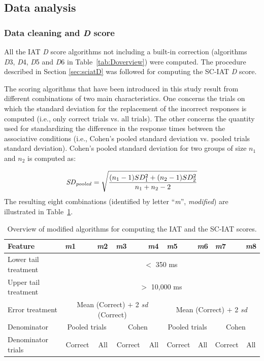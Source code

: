 \documentclass[12pt]{book}
\begin{document}
\subsection{Data analysis}
\subsubsection{Data cleaning and \emph{D} score}

All the IAT \emph{D} score algorithms not including a built-in correction (algorithms \emph{D}3, \emph{D}4, \emph{D}5 and \emph{D}6 in Table~\ref{tab:Doverview}) were computed. The procedure described in Section \ref{sec:sciatD} was followed for computing the SC-IAT \emph{D} score.

The scoring algorithms that have been introduced in this study result from different combinations of two main characteristics. One concerns the trials on which the standard deviation for the replacement of the incorrect responses is computed (i.e., only correct trials vs. all trials). The other concerns the quantity used for standardizing the difference in the response times between the associative conditions (i.e., Cohen's pooled standard deviation vs. pooled trials standard deviation). 
Cohen's pooled standard deviation for two groups of size $n_1$ and $n_2$ is computed as: 

\begin{equation}
	\text{\emph{SD}}_{\text{\emph{pooled}}} = \sqrt\frac{(n_1-1)SD_1^2 + (n_2 -1)SD_2^2}{n_1 + n_2 -2}
\end{equation}
The resulting eight combinations (identified by letter ``\emph{m}'', \emph{modified}) are illustrated in Table~\ref{tab:modified}. 
\begin{table}[h!]
	\centering \doublespacing 
	\caption{\label{tab:modified} Overview of modified algorithms for computing the IAT and the SC-IAT scores.}
	\begin{tabularx}{\textwidth}{l| p{0.9cm} p{0.9cm}p{0.9cm} p{0.9cm}| p{0.9cm} p{0.9cm}p{0.9cm} p{0.9cm}}
		\toprule
		Feature & \emph{m}1 & \emph{m}2  & \emph{m}3 & \emph{m}4 & \emph{m}5 & \emph{m}6 & \emph{m}7 & \emph{m}8 \\
		\midrule
		\multicolumn{1}{l|}{Lower tail treatment} & \multicolumn{8}{c}{$<$ 350 ms}\\
		\multicolumn{1}{l|}{Upper tail treatment} & \multicolumn{8}{c}{$>$ 10,000 ms}\\
		\hline
		\multicolumn{1}{l|}{Error treatment} & \multicolumn{4}{c|}{Mean (Correct) $+$ 2 \emph{sd} (Correct)}  &  \multicolumn{4}{c}{Mean (Correct) $+$ 2 \emph{sd}}\\
		\hline
		\multicolumn{1}{l|}{Denominator} & \multicolumn{2}{c|}{Pooled trials} & \multicolumn{2}{c|}{Cohen} & \multicolumn{2}{c|}{Pooled trials} & \multicolumn{2}{c}{Cohen}\\  
		\hline
		\multicolumn{1}{l|}{Denominator trials} & \multicolumn{1}{c|}{Correct} & \multicolumn{1}{c}{All}  & \multicolumn{1}{c|}{Correct} & \multicolumn{1}{c|}{All} & \multicolumn{1}{c|}{Correct} & \multicolumn{1}{c|}{All} & \multicolumn{1}{c|}{Correct} & \multicolumn{1}{c}{All} \\
		\bottomrule
	\end{tabularx}
\end{table}
\end{document}
